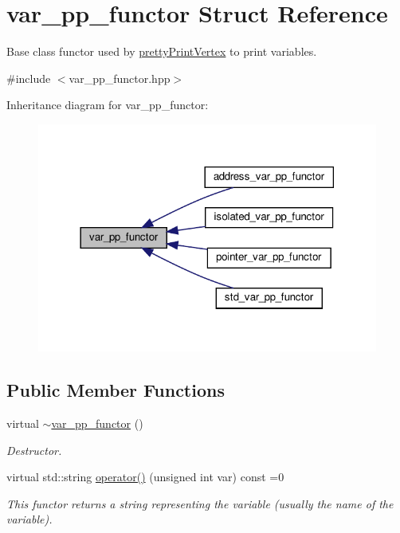 \hypertarget{structvar__pp__functor}{}\section{var\+\_\+pp\+\_\+functor Struct Reference}
\label{structvar__pp__functor}


Base class functor used by \hyperlink{structprettyPrintVertex}{pretty\+Print\+Vertex} to print variables.  




{\ttfamily \#include $<$var\+\_\+pp\+\_\+functor.\+hpp$>$}



Inheritance diagram for var\+\_\+pp\+\_\+functor\+:
\nopagebreak
\begin{figure}[H]
\begin{center}
\leavevmode
\includegraphics[width=318pt]{da/d9b/structvar__pp__functor__inherit__graph}
\end{center}
\end{figure}
\subsection*{Public Member Functions}
\begin{DoxyCompactItemize}
\item 
virtual \hyperlink{structvar__pp__functor_a89bb61a599caec8066ad29dca80ca91f}{$\sim$var\+\_\+pp\+\_\+functor} ()
\begin{DoxyCompactList}\small\item\em Destructor. \end{DoxyCompactList}\item 
virtual std\+::string \hyperlink{structvar__pp__functor_a6bcbd4e1551ac2584638ef70ecc6f361}{operator()} (unsigned int var) const =0
\begin{DoxyCompactList}\small\item\em This functor returns a string representing the variable (usually the name of the variable). \end{DoxyCompactList}\end{DoxyCompactItemize}



